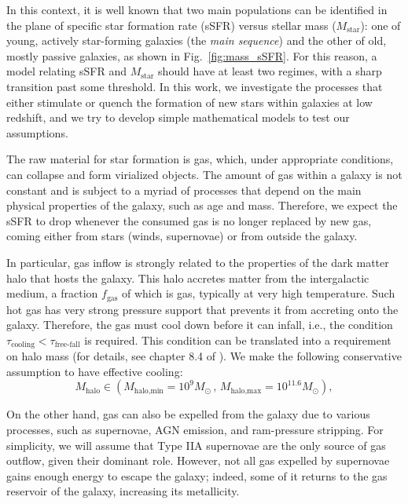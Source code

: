 \documentclass[fleqn,usenatbib]{mnras}
\begin{document}
In this context, it is well known \citep[e.g.,][]{Kauffmann_2003} that two main populations can be identified in the plane of specific star formation rate (sSFR) versus stellar mass ($M_{\text{star}}$): one of young, actively star-forming galaxies (the \textit{main sequence}) and the other of old, mostly passive galaxies, as shown in Fig.~\ref{fig:mass_sSFR}. For this reason, a model relating sSFR and $M_{\text{star}}$ should have at least two regimes, with a sharp transition past some threshold. In this work, we investigate the processes that either stimulate or quench the formation of new stars within galaxies at low redshift, and we try to develop simple mathematical models to test our assumptions.

The raw material for star formation is gas, which, under appropriate conditions, can collapse and form virialized objects. The amount of gas within a galaxy is not constant and is subject to a myriad of processes that depend on the main physical properties of the galaxy, such as age and mass. Therefore, we expect the sSFR to drop whenever the consumed gas is no longer replaced by new gas, coming either from stars (winds, supernovae) or from outside the galaxy. 

In particular, gas inflow is strongly related to the properties of the dark matter halo that hosts the galaxy. This halo accretes matter from the intergalactic medium, a fraction $f_{\text{gas}}$ of which is gas, typically at very high temperature. Such hot gas has very strong pressure support that prevents it from accreting onto the galaxy. Therefore, the gas must cool down before it can infall, i.e., the condition $\tau_{\text{cooling}} < \tau_{\text{free-fall}}$ is required. This condition can be translated into a requirement on halo mass (for details, see chapter 8.4 of \citet{galaxy_formation_and_evolution_2010}). We make the following conservative assumption to have effective cooling:
\begin{equation}
    M_{\text{halo}} \in \left( M_{\text{halo,min}}=10^9 M_\odot \, , \, M_{\text{halo,max}}=10^{11.6} M_\odot \right),
	\label{eq:halo_mass_minmax}
\end{equation}

On the other hand, gas can also be expelled from the galaxy due to various processes, such as supernovae, AGN emission, and ram-pressure stripping. For simplicity, we will assume that Type IIA supernovae are the only source of gas outflow, given their dominant role. However, not all gas expelled by supernovae gains enough energy to escape the galaxy; indeed, some of it returns to the gas reservoir of the galaxy, increasing its metallicity. 
\end{document}
